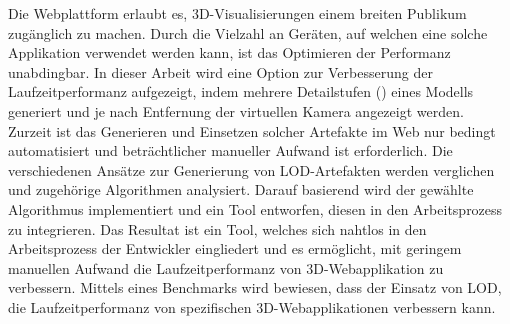 Die Webplattform erlaubt es, 3D-Visualisierungen einem breiten Publikum zugänglich zu machen. Durch die Vielzahl an Geräten, auf welchen eine solche Applikation verwendet werden kann, ist das Optimieren der Performanz unabdingbar. In dieser Arbeit wird eine Option zur Verbesserung der Laufzeitperformanz aufgezeigt, indem mehrere Detailstufen () eines Modells generiert und je nach Entfernung der virtuellen Kamera angezeigt werden.
\bigbreak
Zurzeit ist das Generieren und Einsetzen solcher Artefakte im Web nur bedingt automatisiert und beträchtlicher manueller Aufwand ist erforderlich.
Die verschiedenen Ansätze zur Generierung von LOD-Artefakten werden verglichen und zugehörige Algorithmen analysiert.
Darauf basierend wird der gewählte Algorithmus implementiert und ein Tool entworfen, diesen in den Arbeitsprozess zu integrieren.
\bigbreak
Das Resultat ist ein Tool, welches sich nahtlos in den Arbeitsprozess der Entwickler eingliedert und es ermöglicht, mit geringem manuellen Aufwand die Laufzeitperformanz von 3D-Webapplikation zu verbessern.
Mittels eines Benchmarks wird bewiesen, dass der Einsatz von LOD, die Laufzeitperformanz von spezifischen 3D-Webapplikationen verbessern kann.